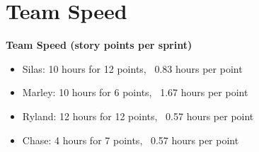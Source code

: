 \section{Team Speed}
\textbf{Team Speed (story points per sprint)}
\begin{itemize}
    \item Silas: 10 hours for 12 points, ~0.83 hours per point
    \item Marley: 10 hours for 6 points, ~1.67 hours per point
    \item Ryland: 12 hours for 12 points, ~0.57 hours per point
    \item Chase: 4 hours for 7 points, ~0.57 hours per point
\end{itemize}
